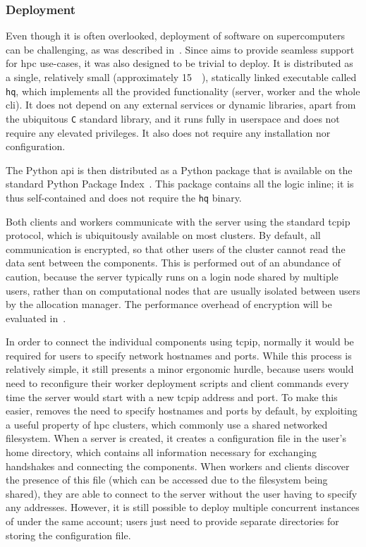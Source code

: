 \subsubsection*{Deployment}
Even though it is often overlooked, deployment of software on supercomputers can be challenging, as
was described in~. Since \hyperqueue{} aims to provide seamless
support for \gls{hpc} use-cases, it was also designed to be trivial to deploy. It is
distributed as a single, relatively small (approximately \SI{15}{\mebi\byte}), statically
linked executable called \texttt{hq}, which implements all the provided functionality
(server, worker and the whole \gls{cli}). It does not depend on any external services
or dynamic libraries, apart from the ubiquitous \texttt{C} standard library, and it
runs fully in userspace and does not require any elevated privileges. It also does not require any
installation nor configuration.

The \hyperqueue{} Python \gls{api} is then distributed as a Python package
that is available on the standard Python Package Index~\cite{hq_pypi}. This package
contains all the \hq{} logic inline; it is thus self-contained and does not
require the \texttt{hq} binary.

Both clients and workers communicate with the server using the standard \gls{tcpip}
protocol, which is ubiquitously available on most clusters. By default, all communication is
encrypted, so that other users of the cluster cannot read the data sent between the
\hyperqueue{} components. This is performed out of an abundance of caution, because the
server typically runs on a login node shared by multiple users, rather than on computational nodes
that are usually isolated between users by the allocation manager. The performance overhead of
encryption will be evaluated in~.

In order to connect the individual components using \gls{tcpip}, normally it would be
required for users to specify network hostnames and ports. While this process is relatively simple,
it still presents a minor ergonomic hurdle, because users would need to reconfigure their worker
deployment scripts and client commands every time the server would start with a new
\gls{tcpip} address and port. To make this easier, \hyperqueue{} removes the
need to specify hostnames and ports by default, by exploiting a useful property of
\gls{hpc} clusters, which commonly use a shared networked filesystem. When a server
is created, it creates a configuration file in the user's home directory, which contains all
information necessary for exchanging handshakes and connecting the components. When workers and
clients discover the presence of this file (which can be accessed due to the filesystem being
shared), they are able to connect to the server without the user having to specify any addresses.
However, it is still possible to deploy multiple concurrent instances of \hyperqueue{}
under the same account; users just need to provide separate directories for storing the
configuration file.

